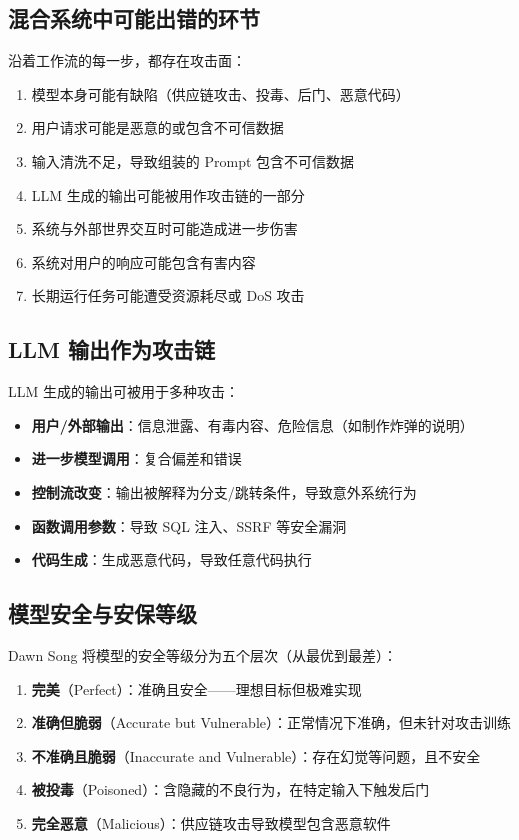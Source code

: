 \documentclass[a4paper]{article}
\begin{document}
\subsection{混合系统中可能出错的环节}

沿着工作流的每一步，都存在攻击面：
\begin{enumerate}
    \item 模型本身可能有缺陷（供应链攻击、投毒、后门、恶意代码）
    \item 用户请求可能是恶意的或包含不可信数据
    \item 输入清洗不足，导致组装的 Prompt 包含不可信数据
    \item LLM 生成的输出可能被用作攻击链的一部分
    \item 系统与外部世界交互时可能造成进一步伤害
    \item 系统对用户的响应可能包含有害内容
    \item 长期运行任务可能遭受资源耗尽或 DoS 攻击
\end{enumerate}

\subsection{LLM 输出作为攻击链}

LLM 生成的输出可被用于多种攻击：
\begin{itemize}
    \item \textbf{用户/外部输出}：信息泄露、有毒内容、危险信息（如制作炸弹的说明）
    \item \textbf{进一步模型调用}：复合偏差和错误
    \item \textbf{控制流改变}：输出被解释为分支/跳转条件，导致意外系统行为
    \item \textbf{函数调用参数}：导致 SQL 注入、SSRF 等安全漏洞
    \item \textbf{代码生成}：生成恶意代码，导致任意代码执行
\end{itemize}

\subsection{模型安全与安保等级}

Dawn Song 将模型的安全等级分为五个层次（从最优到最差）：
\begin{enumerate}
    \item \textbf{完美}（Perfect）：准确且安全——理想目标但极难实现
    \item \textbf{准确但脆弱}（Accurate but Vulnerable）：正常情况下准确，但未针对攻击训练
    \item \textbf{不准确且脆弱}（Inaccurate and Vulnerable）：存在幻觉等问题，且不安全
    \item \textbf{被投毒}（Poisoned）：含隐藏的不良行为，在特定输入下触发后门
    \item \textbf{完全恶意}（Malicious）：供应链攻击导致模型包含恶意软件
\end{enumerate}
\end{document}
